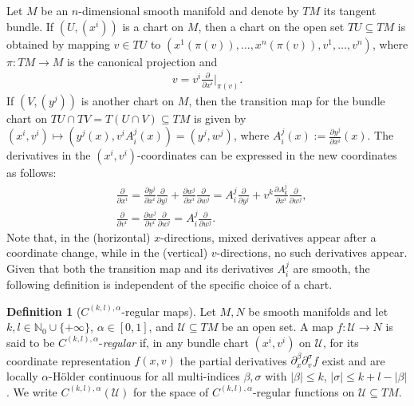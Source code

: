 \documentclass[a4paper,11pt]{article}
\numberwithin{equation}{section}
\theoremstyle{definition}
\newtheorem{Definition}{Definition}[section]
\theoremstyle{plain}
\begin{document}
Let $M$ be an $n$-dimensional smooth manifold and denote by $TM$ its tangent bundle.
If $(U,(x^i))$ is a chart on $M$, then a chart on the open set $TU \subseteq TM$ is obtained by mapping $v \in TU$ to $(x^1(\pi(v)),\ldots,x^n(\pi(v)), v^1,\ldots,v^n)$, where $\pi:TM \to M$ is the canonical projection and
\begin{align*}
    v = v^i \frac{\partial}{\partial x^i}\bigg|_{\pi(v)}.
\end{align*}
If $(V,(y^j))$ is another chart on $M$, then the transition map for the bundle chart on $TU \cap TV = T(U \cap V) \subseteq TM$ is given by $(x^i,v^i) \mapsto (y^j(x),v^i A^{j}_i(x)) = (y^j,w^j)$, where $A^j_i(x) := \frac{\partial y^j}{\partial x^i}(x)$.
The derivatives in the $(x^i,v^i)$-coordinates can be expressed in the new coordinates as follows:
\begin{align*}
    &\frac{\partial}{\partial x^i} 
    = \frac{\partial y^j}{\partial x^i}\frac{\partial}{\partial y^j} 
    + \frac{\partial w^j}{\partial x^i} \frac{\partial}{\partial w^j} 
    = A^j_i \frac{\partial}{\partial y^j} 
    + v^k \frac{\partial A^j_k}{\partial x^i} \frac{\partial}{\partial w^j},\\
    &\frac{\partial}{\partial v^i} 
    = \frac{\partial w^j}{\partial v^i} \frac{\partial}{\partial w^j} 
    = A^j_i \frac{\partial}{\partial w^j}.
\end{align*}
Note that, in the (horizontal) $x$-directions, mixed derivatives appear after a coordinate change, while in the (vertical) $v$-directions, no such derivatives appear. 
Given that both the transition map and its derivatives $A^j_i$ are smooth, the following definition is independent of the specific choice of a chart.

\begin{Definition}[$C^{(k,l),\alpha}$-regular maps]
    Let $M, N$ be smooth manifolds and let $k,l \in \mathbb{N}_0 \cup \{+\infty\}$, $\alpha \in [0,1]$, and $\mathcal{U} \subseteq TM$ be an open set.
    A map $f: \mathcal{U} \to N$ is said to be $C^{(k,l),\alpha}$-\emph{regular} if, in any bundle chart $(x^i,v^i)$ on $\mathcal{U}$, for its coordinate representation $f(x,v)$ the partial derivatives $\partial_x^{\beta} \partial_v^{\sigma} f$ exist and are
    locally $\alpha$-H\"older continuous 
    for all multi-indices $\beta,\sigma$ with $|\beta|\leq k$, $|\sigma| \leq k + l - |\beta|$.
    We write $C^{(k,l),\alpha}(\mathcal{U})$ for the space of $C^{(k,l),\alpha}$-regular functions on $\mathcal{U} \subseteq TM$. 
\end{Definition}
\end{document}
